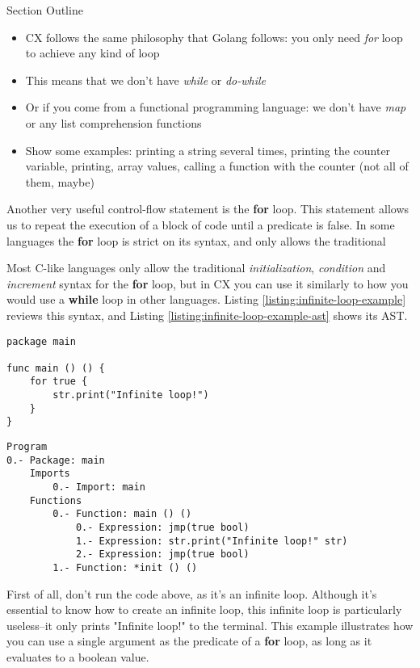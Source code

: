 \documentclass[11pt,fleqn,openany]{book} %
\begin{document}
\begin{remark}
Section Outline
    \begin{itemize}
    \item CX follows the same philosophy that Golang follows: you only need \textit{for} loop to achieve any kind of loop
    \item This means that we don't have \textit{while} or \textit{do-while}
    \item Or if you come from a functional programming language: we don't have \textit{map} or any list comprehension functions
    \item Show some examples: printing a string several times, printing the counter variable, printing, array values, calling a function with the counter (not all of them, maybe)
    \end{itemize}
\end{remark}

Another very useful control-flow statement is the \textbf{for} loop. This statement allows us to repeat the execution of a block of code until a predicate is false. In some languages the \textbf{for} loop is strict on its syntax, and only allows the traditional

Most C-like languages only allow the traditional \emph{initialization}, \emph{condition} and \emph{increment} syntax for the \textbf{for} loop, but in CX you can use it similarly to how you would use a \textbf{while} loop in other languages. Listing \ref{listing:infinite-loop-example} reviews this syntax, and Listing \ref{listing:infinite-loop-example-ast} shows its AST.

\begin{lstlisting}[caption={Infinite Loop Example},captionpos=b,label={listing:infinite-loop-example}]
package main

func main () () {
	for true {
		str.print("Infinite loop!")
	}
}
\end{lstlisting}

\begin{lstlisting}[caption={Listing \ref{listing:infinite-loop-example}'s Abstract Syntax Tree},captionpos=b,label={listing:infinite-loop-example-ast}]
Program
0.- Package: main
	Imports
		0.- Import: main
	Functions
		0.- Function: main () ()
			0.- Expression: jmp(true bool)
			1.- Expression: str.print("Infinite loop!" str)
			2.- Expression: jmp(true bool)
		1.- Function: *init () ()
\end{lstlisting}

First of all, don't run the code above, as it's an infinite loop. Although it's essential to know how to create an infinite loop, this infinite loop is particularly useless--it only prints "Infinite loop!" to the terminal. This example illustrates how you can use a single argument as the predicate of a \textbf{for} loop, as long as it evaluates to a boolean value.
\end{document}
